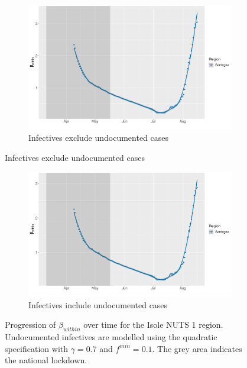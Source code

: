 \documentclass[12pt]{article}
\begin{document}
\begin{appendices}
		\begin{figure}[H]
    	    \centering
    	    \begin{subfigure}{\textwidth}
    	      \centering
    	      \includegraphics[width=0.94\linewidth]{output/model_within_lag14_betawithin_Isole_rollingwindow30.pdf}
    	      \caption{Infectives exclude undocumented cases}
    	      \label{fig:beta_within_over_time_isole_lowsample_regular}
    	    \end{subfigure}\newline
        \end{figure}
        \begin{figure}[H]\ContinuedFloat
    	    \begin{subfigure}{\textwidth}
    	      \centering
    	      \includegraphics[width=0.94\linewidth]{output/model_within_lag14_betawithin_Isole_UndocQuadratic_rollingwindow30.pdf}
    	      \caption{Infectives include undocumented cases}
    	      \label{fig:beta_within_over_time_isole_lowsample_regular_undoc}
    	    \end{subfigure}
    	    \caption{Progression of $\beta_{within}$ over time for the Isole NUTS 1 region. Undocumented infectives are modelled using the quadratic specification with $\gamma = 0.7$ and $f^{min}=0.1$. The grey area indicates the national lockdown.}
    	    \label{fig:beta_within_over_time_isole_lowsample}
	    \end{figure}
		

\end{appendices}
\end{document}
